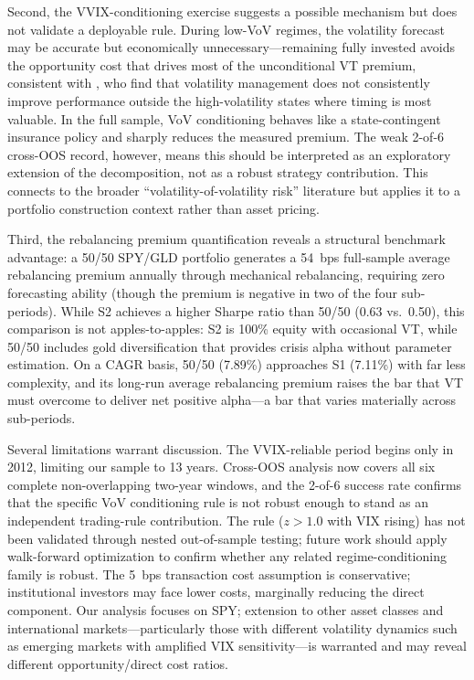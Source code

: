 \documentclass[12pt,a4paper]{article}
\begin{document}
Second, the VVIX-conditioning exercise suggests a possible mechanism but does not validate a deployable rule. During low-VoV regimes, the volatility forecast may be accurate but economically unnecessary---remaining fully invested avoids the opportunity cost that drives most of the unconditional VT premium, consistent with \citet{liu2019}, who find that volatility management does not consistently improve performance outside the high-volatility states where timing is most valuable. In the full sample, VoV conditioning behaves like a state-contingent insurance policy and sharply reduces the measured premium. The weak 2-of-6 cross-OOS record, however, means this should be interpreted as an exploratory extension of the decomposition, not as a robust strategy contribution. This connects to the broader ``volatility-of-volatility risk'' literature \citep{bollerslev2009, huang2019, todorov2010, bekaert2014} but applies it to a portfolio construction context rather than asset pricing.

Third, the rebalancing premium quantification reveals a structural benchmark advantage: a 50/50 SPY/GLD portfolio generates a 54~bps full-sample average rebalancing premium annually through mechanical rebalancing, requiring zero forecasting ability (though the premium is negative in two of the four sub-periods). While S2 achieves a higher Sharpe ratio than 50/50 (0.63 vs.\ 0.50), this comparison is not apples-to-apples: S2 is 100\% equity with occasional VT, while 50/50 includes gold diversification that provides crisis alpha without parameter estimation. On a CAGR basis, 50/50 (7.89\%) approaches S1 (7.11\%) with far less complexity, and its long-run average rebalancing premium raises the bar that VT must overcome to deliver net positive alpha---a bar that varies materially across sub-periods.

Several limitations warrant discussion. The VVIX-reliable period begins only in 2012, limiting our sample to 13 years. Cross-OOS analysis now covers all six complete non-overlapping two-year windows, and the 2-of-6 success rate confirms that the specific VoV conditioning rule is not robust enough to stand as an independent trading-rule contribution. The rule ($z > 1.0$ with VIX rising) has not been validated through nested out-of-sample testing; future work should apply walk-forward optimization to confirm whether any related regime-conditioning family is robust. The 5~bps transaction cost assumption is conservative; institutional investors may face lower costs, marginally reducing the direct component. Our analysis focuses on SPY; extension to other asset classes and international markets---particularly those with different volatility dynamics such as emerging markets with amplified VIX sensitivity---is warranted and may reveal different opportunity/direct cost ratios.
\end{document}
